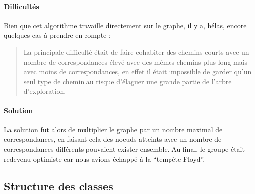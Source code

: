 \documentclass[french, 12pt]{article}
\begin{document}
\paragraph{Difficultés}
Bien que cet algorithme travaille directement sur le graphe, il y a, hélas, encore quelques cas à prendre en compte :

\begin{quote}  
  La principale difficulté était de faire cohabiter des chemins courts avec un nombre de correspondances élevé avec des mêmes chemins plus long mais avec moins de correspondances, en effet il était impossible de garder qu'un seul type de chemin au risque d'élaguer une grande partie de l'arbre d'exploration.
\end{quote}

\paragraph{Solution}
La solution fut alors de multiplier le graphe par un nombre maximal de correspondances, en faisant cela des noeuds atteints avec un nombre de correspondances différents pouvaient exister ensemble.
Au final, le groupe était redevenu optimiste car nous avions échappé à la ``tempête Floyd''.

\subsection{Structure des classes}
\end{document}
